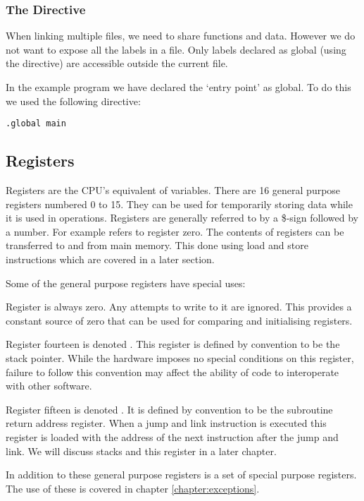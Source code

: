 \subsubsection{The \Global Directive}
When linking multiple files, we need to share functions and data.
However we do not want to expose all the labels in a file.
Only labels declared as global (using the \Global directive) are
accessible outside the current file.  

In the example program we have declared the `entry point'  as 
global. To do this we used the following directive:
\begin{verbatim}
.global main
\end{verbatim}


\subsection{Registers}
Registers are the CPU's equivalent of variables.  There are 16 general
purpose registers numbered 0 to 15. They can be used for temporarily
storing data while it is used in operations.  Registers are generally
referred to by a \$-sign followed by a number.  For example 
refers to register zero. The contents of registers can be transferred
to and from main memory. This done using load and store instructions
which are covered in a later section.


Some of the general purpose registers have special uses:

Register  is always zero.  Any attempts to write to it are
ignored.  This provides a constant source of zero that can be used for
comparing and initialising registers.

Register fourteen is denoted . This register is defined by
convention to be the stack pointer.  While the hardware imposes no
special conditions on this register, failure to follow this convention
may affect the ability of code to interoperate with other software.

Register fifteen is denoted . It is defined by convention to
be the subroutine return address register.  When a jump and link
instruction is executed this register is loaded with the address of
the next instruction after the jump and link. We will discuss stacks
and this register in a later chapter.

In addition to these general purpose registers is a set of special
purpose registers.  The use of these is covered in chapter
\ref{chapter:exceptions}.

